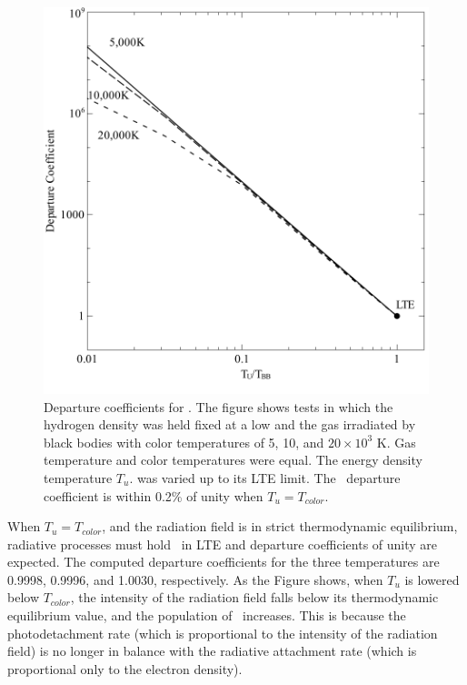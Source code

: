 \begin{figure}
\centering
\label{fig:Hmi_vs_U}
\includegraphics[scale=0.7]{Hmi_vs_U}
\caption[\protect\hminus\ departure coefficients vs radiation energy density]{Departure coefficients for \hminus.  The figure shows tests in which
the hydrogen density was held fixed at a low and the gas irradiated by black
bodies with color temperatures of 5, 10, and $20 \times 10^3$ K.  Gas temperature
and color temperatures were equal. The energy density temperature $T_u$. was
varied up to its LTE limit.  The \hminus\ departure coefficient is within 0.2\%
of unity when $T_u = T_{color}$.}
\end{figure}

When $T_u = T_{color}$, and the radiation field is in strict thermodynamic
equilibrium, radiative processes must hold \hminus\ in LTE and departure
coefficients of unity are expected.  The computed departure coefficients
for the three temperatures are 0.9998, 0.9996, and 1.0030, respectively.
As the Figure shows, when $T_u$ is lowered below $T_{color}$, the intensity of the
radiation field falls below its thermodynamic equilibrium value, and the
population of \hminus\ increases.  This is because the photodetachment rate (which
is proportional to the intensity of the radiation field) is no longer in
balance with the radiative attachment rate (which is proportional only to
the electron density).

